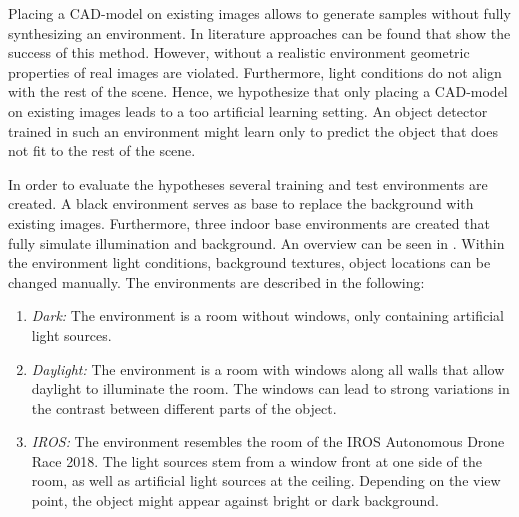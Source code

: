 Placing a \ac{CAD}-model on existing images allows to generate samples without fully synthesizing an environment. In literature \cite{Madaan2017, Peng} approaches can be found that show the success of this method. However, without a realistic environment geometric properties of real images are violated. Furthermore, light conditions do not align with the rest of the scene. Hence, we hypothesize that only placing a \ac{CAD}-model on existing images leads to a too artificial learning setting. An object detector trained in such an environment might learn only to predict the object that does not fit to the rest of the scene.

In order to evaluate the hypotheses several training and test environments are created. A black environment serves as base to replace the background with existing images. Furthermore, three indoor base environments are created that fully simulate illumination and background. An overview can be seen in . Within the environment light conditions, background textures, object locations can be changed manually. The environments are described in the following:

\begin{enumerate}
	\item \textit{Dark:} The environment is a room without windows, only containing artificial light sources. 
	\item \textit{Daylight:} The environment is a room with windows along all walls that allow daylight to illuminate the room. The windows can lead to strong variations in the contrast between different parts of the object.
	\item \textit{IROS:} The environment resembles the room of the \ac{IROS} Autonomous Drone Race 2018. The light sources stem from a window front at one side of the room, as well as artificial light sources at the ceiling. Depending on the view point, the object might appear against bright or dark background.
\end{enumerate}


